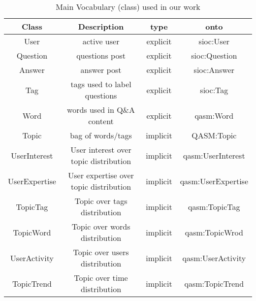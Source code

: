 \begin{sidewaystable}
    \centering
    \begin{tabular}{c|c|c|c}
    \hline
    Class &  Description & type & onto \\ \hline
    User  & active user & explicit &  sioc:User \\ \hline
    Question & questions post & explicit & sioc:Question \\ \hline
    Answer  & answer post & explicit & sioc:Answer \\ \hline
    Tag & tags used to label questions & explicit & sioc:Tag \\ \hline
    Word & words used in Q\&A content & explicit & qasm:Word \\ \hline
    Topic & bag of words/tags & implicit & QASM:Topic \\ \hline     
    UserInterest& User interest over topic distribution & implicit& qasm:UserInterest\\ \hline
    UserExpertise & User expertise over topic distribution &implicit& qasm:UserExpertise \\ \hline
    TopicTag &Topic over tags distribution&implicit &qasm:TopicTag \\ \hline
    TopicWord&Topic over words distribution &implicit & qasm:TopicWrod\\ \hline
    UserActivity&Topic over users distribution & implicit &qasm:UserActivity \\ \hline
    TopicTrend &Topic over time distribution &implicit & qasm:TopicTrend\\ \hline
          
    \end{tabular}
    \caption{Main Vocabulary (class) used in our work}
    \label{tab:qaontoclass}
\end{sidewaystable}


